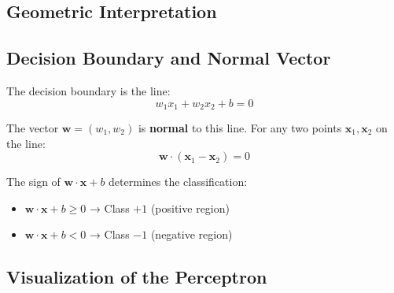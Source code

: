 \begin{notechapter}
\section{Geometric Interpretation}

\subsection{Decision Boundary and Normal Vector}

The decision boundary is the line:
\[
w_1 x_1 + w_2 x_2 + b = 0
\]

The vector $\mathbf{w} = (w_1, w_2)$ is \textbf{normal} to this line. For any two points $\mathbf{x}_1, \mathbf{x}_2$ on the line:
\[
\mathbf{w} \cdot (\mathbf{x}_1 - \mathbf{x}_2) = 0
\]

The sign of $\mathbf{w} \cdot \mathbf{x} + b$ determines the classification:
\begin{itemize}
    \item $\mathbf{w} \cdot \mathbf{x} + b \geq 0$ → Class $+1$ (positive region)
    \item $\mathbf{w} \cdot \mathbf{x} + b < 0$ → Class $-1$ (negative region)
\end{itemize}

\subsection{Visualization of the Perceptron}

\begin{figure}[H]
\centering
{}
\end{figure}
\end{notechapter}
